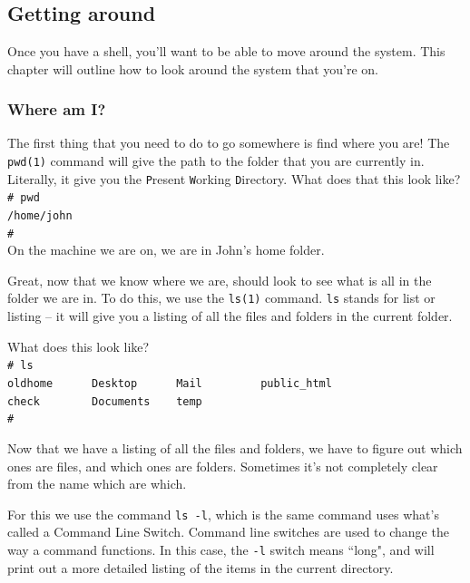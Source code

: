 \chapter[The Shell]{}

\section{Getting around}

Once you have a shell, you'll want to be able to move around the system. 
This chapter will outline how to look around the system that you're on.

\subsection{Where am I?}
The first thing that you need to do to go somewhere is find where you are!  
The {\tt pwd(1)} command will give the path to the folder that you are currently in.  
Literally, it give you the {\tt P}resent {\tt W}orking {\tt D}irectory.   
What does that this look like?
{\\
\tt \# pwd\\
/home/john\\
\#\\
}
On the machine we are on, we are in John's home folder.

Great, now that we know where we are, should look to see what is all in the folder we are in. To do this, we use the {\tt ls(1)} command. {\tt ls} stands for list or listing -- it will give you a listing of all the files and folders in the current folder.

What does this look like?
{\tt \\
\# ls\\
oldhome\ \ \ \ \ \ Desktop\ \ \ \ \ \ Mail\ \ \ \ \ \ \ \ \ public\_html\\
check\ \ \ \ \ \ \ \ Documents\ \ \ \ temp\\
\# \\
}

Now that we have a listing of all the files and folders, we have to figure out which ones are files, and which ones are folders.  Sometimes it's not completely clear from the name which are which.

For this we use the command {\tt ls -l}, which is the same command uses what's called a Command Line Switch.  Command line switches are used
to change the way a command functions.  In this case, the {\tt -l} switch means ``long", and will print out a more detailed listing of the items in the current directory.

